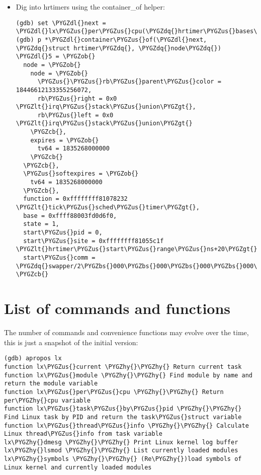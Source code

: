 \documentclass[a4paper,8pt,english]{sphinxmanual}
\def\PYGZbs{\char`\\}
\def\PYGZus{\char`\_}
\def\PYGZob{\char`\{}
\def\PYGZcb{\char`\}}
\def\PYGZlt{\char`\<}
\def\PYGZgt{\char`\>}
\def\PYGZdl{\char`\$}
\def\PYGZhy{\char`\-}
\def\PYGZdq{\char`\"}
\begin{document}
\begin{itemize}
\item {} 
Dig into hrtimers using the container\_of helper:

\begin{Verbatim}[commandchars=\\\{\}]
(gdb) set \PYGZdl{}next = \PYGZdl{}lx\PYGZus{}per\PYGZus{}cpu(\PYGZdq{}hrtimer\PYGZus{}bases\PYGZdq{}).clock\PYGZus{}base[0].active.next
(gdb) p *\PYGZdl{}container\PYGZus{}of(\PYGZdl{}next, \PYGZdq{}struct hrtimer\PYGZdq{}, \PYGZdq{}node\PYGZdq{})
\PYGZdl{}5 = \PYGZob{}
  node = \PYGZob{}
    node = \PYGZob{}
      \PYGZus{}\PYGZus{}rb\PYGZus{}parent\PYGZus{}color = 18446612133355256072,
      rb\PYGZus{}right = 0x0 \PYGZlt{}irq\PYGZus{}stack\PYGZus{}union\PYGZgt{},
      rb\PYGZus{}left = 0x0 \PYGZlt{}irq\PYGZus{}stack\PYGZus{}union\PYGZgt{}
    \PYGZcb{},
    expires = \PYGZob{}
      tv64 = 1835268000000
    \PYGZcb{}
  \PYGZcb{},
  \PYGZus{}softexpires = \PYGZob{}
    tv64 = 1835268000000
  \PYGZcb{},
  function = 0xffffffff81078232 \PYGZlt{}tick\PYGZus{}sched\PYGZus{}timer\PYGZgt{},
  base = 0xffff88003fd0d6f0,
  state = 1,
  start\PYGZus{}pid = 0,
  start\PYGZus{}site = 0xffffffff81055c1f \PYGZlt{}hrtimer\PYGZus{}start\PYGZus{}range\PYGZus{}ns+20\PYGZgt{},
  start\PYGZus{}comm = \PYGZdq{}swapper/2\PYGZbs{}000\PYGZbs{}000\PYGZbs{}000\PYGZbs{}000\PYGZbs{}000\PYGZbs{}000\PYGZdq{}
\PYGZcb{}
\end{Verbatim}

\end{itemize}


\section{List of commands and functions}
\label{dev-tools/gdb-kernel-debugging:list-of-commands-and-functions}
The number of commands and convenience functions may evolve over the time,
this is just a snapshot of the initial version:

\begin{Verbatim}[commandchars=\\\{\}]
(gdb) apropos lx
function lx\PYGZus{}current \PYGZhy{}\PYGZhy{} Return current task
function lx\PYGZus{}module \PYGZhy{}\PYGZhy{} Find module by name and return the module variable
function lx\PYGZus{}per\PYGZus{}cpu \PYGZhy{}\PYGZhy{} Return per\PYGZhy{}cpu variable
function lx\PYGZus{}task\PYGZus{}by\PYGZus{}pid \PYGZhy{}\PYGZhy{} Find Linux task by PID and return the task\PYGZus{}struct variable
function lx\PYGZus{}thread\PYGZus{}info \PYGZhy{}\PYGZhy{} Calculate Linux thread\PYGZus{}info from task variable
lx\PYGZhy{}dmesg \PYGZhy{}\PYGZhy{} Print Linux kernel log buffer
lx\PYGZhy{}lsmod \PYGZhy{}\PYGZhy{} List currently loaded modules
lx\PYGZhy{}symbols \PYGZhy{}\PYGZhy{} (Re\PYGZhy{})load symbols of Linux kernel and currently loaded modules
\end{Verbatim}
\end{document}
